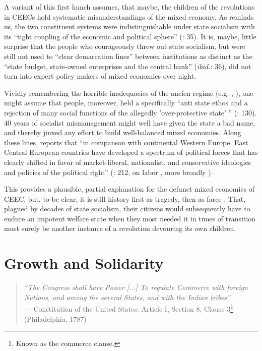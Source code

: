 \documentclass[11pt,a4paper,oneside,openright]{article}
\begin{document}
A variant of this first hunch assumes, that maybe, the children of the revolutions in \glspl{CEEC} hold systematic misunderstandings of the mixed economy. 
As \citeauthor{Bonker2006} reminds us, the two constituent systems were indistinguishable under state socialism with its ``tight coupling of the economic and political sphere'' (\citeyear{Bonker2006}: 35). 
It is, maybe, little surprise that the people who courageously threw out state socialism, but were still not used to ``clear demarcation lines'' between institutions as distinct as the ``state budget, state-owned enterprises and the central bank'' (\emph{ibid.}: 36), did not turn into expert policy makers of mixed economies over night.

Vividly remembering the horrible inadequacies of the ancien regime (e.g. \citealt{Szikra2009}, \citealt{Millard1992}), one might assume that people, moreover, held a specifically  ``anti state ethos and a rejection of many social functions of the allegedly 'over-protective state' '' (\citealt{Millard1992}: 130). 
40 years of socialist mismanagement might well have given the state a bad name, and thereby jinxed any effort to build well-balanced mixed economies. 
Along these lines, \citeauthor{Inglot2008} reports that ``in companson with continental Western Europe, East Central European countries have developed a spectrum of political forces that has clearly shifted in favor of market-liberal, nationalist, and conservative ideologies and policies of the political right'' (\citeyear{Inglot2008}: 212, on labor \citealt{Crowley2002}, more broadly \citealt{OrenOuto2001}).

This provides a plausible, partial explanation for the defunct mixed economies of \gls{CEEC}, but, to be clear, it is still history first as tragedy, then as farce \citep{Marx1852}. 
That, plagued by decades of state socialism, their citizens would subsequently have to endure an impotent welfare state when they most needed it in times of transition must surely be another instance of a revolution devouring its own children.

\section{Growth and Solidarity} \label{sec:growth_solidarity}

\begin{quote}
	\emph{``The Congress shall have Power [...] To regulate Commerce with foreign Nations, and among the several States, and with the Indian tribes''}\\
	--- Constitution of the United States: Article I, Section 8, Clause 3\footnote{
		Known as the commerce clause.} 
	(Philadelphia, 1787)
\end{quote}
\end{document}
